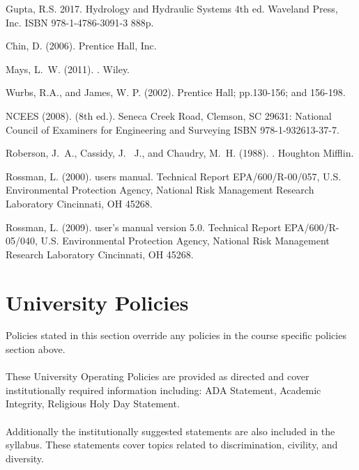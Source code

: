 \documentclass[12pt]{article}
\begin{document}
\begin{thebibliography}{}
Gupta, R.S. 2017. Hydrology and Hydraulic Systems 4th ed. Waveland Press, Inc. ISBN 978-1-4786-3091-3 888p.

Chin, D. (2006). 
\newblock Prentice Hall, Inc.

Mays, L.~W. (2011).
.
\newblock Wiley.

Wurbs, R.A., and James, W. P. (2002).
\newblock Prentice Hall; pp.130-156; and 156-198. 

NCEES (2008).
 (8th
  ed.).
 Seneca Creek Road, Clemson, SC 29631: National Council of
  Examiners for Engineering and Surveying {ISBN 978-1-932613-37-7}.

Roberson, J.~A., Cassidy, J. ~J., and Chaudry, M.~H.  (1988).
.
\newblock Houghton Mifflin.

Rossman, L. (2000).
 users manual.
\newblock Technical Report EPA/600/R-00/057, U.S. Environmental Protection
  Agency, National Risk Management Research Laboratory Cincinnati, OH 45268.
  
Rossman, L. (2009).
 user's manual version 5.0.
\newblock Technical Report EPA/600/R-05/040, U.S. Environmental Protection
  Agency, National Risk Management Research Laboratory Cincinnati, OH 45268.


\section*{University Policies}
Policies stated in this section override any policies in the course specific policies section above.
~\\~\\
These University Operating Policies are provided as directed and cover institutionally required information including: 
ADA Statement, Academic Integrity, Religious Holy Day Statement.
\\~\\
Additionally the institutionally suggested statements are also included in the syllabus.  
These statements cover topics related to discrimination, civility, and diversity.  


\end{thebibliography}
\end{document}
